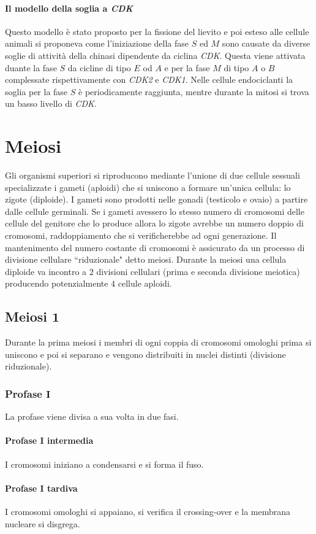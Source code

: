 \paragraph{Il modello della soglia a \emph{CDK}}
Questo modello \`e stato proposto per la fissione del lievito e poi esteso alle cellule animali si proponeva come l'iniziazione della fase $S$ ed $M$ sono causate da diverse soglie di
attivit\`a della chinasi dipendente da ciclina \emph{CDK}. Questa viene attivata duante la fase $S$ da cicline di tipo $E$ od $A$ e per la fase $M$ di tipo $A$ o $B$ complessate
rispettivamente con \emph{CDK2} e \emph{CDK1}. Nelle cellule endociclanti la soglia per la fase $S$ \`e periodicamente raggiunta, mentre durante la mitosi si trova un basso livello di
\emph{CDK}.
\section{Meiosi}
Gli organismi superiori si riproducono mediante l'unione di due cellule sessuali specializzate i gameti (aploidi) che si uniscono a formare un'unica cellula: lo zigote (diploide). I 
gameti sono prodotti nelle gonadi (testicolo e ovaio) a partire dalle cellule germinali. Se i gameti avessero lo stesso numero di cromosomi delle cellule del genitore che lo produce 
allora lo zigote avrebbe un numero doppio di cromosomi, raddoppiamento che si verificherebbe ad ogni generazione. Il mantenimento del numero costante di cromosomi \`e assicurato da
un processo di divisione cellulare ``riduzionale" detto meiosi. Durante la meiosi una cellula diploide va incontro a $2$ divisioni cellulari (prima e seconda divisione meiotica) 
producendo potenzialmente $4$ cellule aploidi.
\subsection{Meiosi $\mathbf{1}$}
Durante la prima meiosi i membri di ogni coppia di cromosomi omologhi prima si uniscono e poi si separano e vengono distribuiti in nuclei distinti (divisione riduzionale). 
\subsubsection{Profase $\mathbf{I}$}
La profase viene divisa a sua volta in due fasi.
\paragraph{Profase $\mathbf{I}$ intermedia}
I cromosomi iniziano a condensarsi e si forma il fuso. 
\paragraph{Profase $\mathbf{I}$ tardiva}
I cromosomi omologhi si appaiano, si verifica il crossing-over e la membrana nucleare si disgrega.
